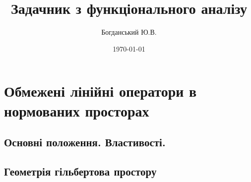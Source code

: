 \documentclass{extreport}
\author{Богданський Ю.В.}
\title{Задачник з функціонального аналізу}
\date{\today}
\begin{document}
    \maketitle
    \tableofcontents
    \chapter{Обмежені лінійні оператори в нормованих просторах}
        \section{Основні положення. Властивості.}
            
            
            
        \section{Геометрія гільбертова простору}
            
\end{document}

